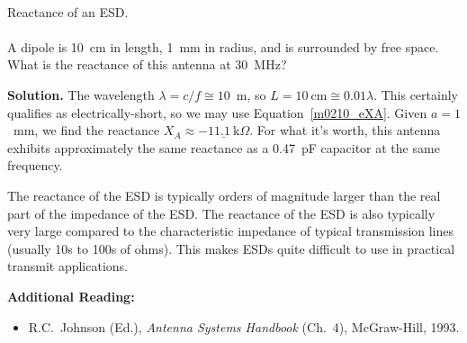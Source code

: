 ~\\ \begin{example} 
\begin{mdframed}[backgroundcolor=brown!20,linecolor=brown!20]\raggedright
Reactance of an ESD. 
\\~\\
A dipole is 10~cm in length, 1~mm in radius, and is surrounded by free space.
What is the reactance of this antenna at 30~MHz?

{\bf Solution.}
The wavelength $\lambda=c/f \cong 10$~m, so $L = 10~\mbox{cm} \cong 0.01\lambda$.
This certainly qualifies as electrically-short, so we may use Equation~\ref{m0210_eXA}.
Given $a=1$~mm, we find the reactance $X_A \approx \underline{-11.1~\mbox{k}\Omega}$.
For what it's worth, this antenna exhibits approximately the same reactance as a 0.47~pF capacitor at the same frequency.

\end{mdframed}
\end{example}

The reactance of the ESD is typically orders of magnitude larger than the real part of the impedance of the ESD.
The reactance of the ESD is also typically very large compared to the characteristic impedance of typical transmission lines (usually 10s to 100s of ohms). 
This makes ESDs quite difficult to use in practical transmit applications.


{\bf Additional Reading:}
\begin{itemize}
\item R.C.\ Johnson (Ed.), \emph{Antenna Systems Handbook} (Ch.\ 4), McGraw-Hill, 1993.
\end{itemize}



